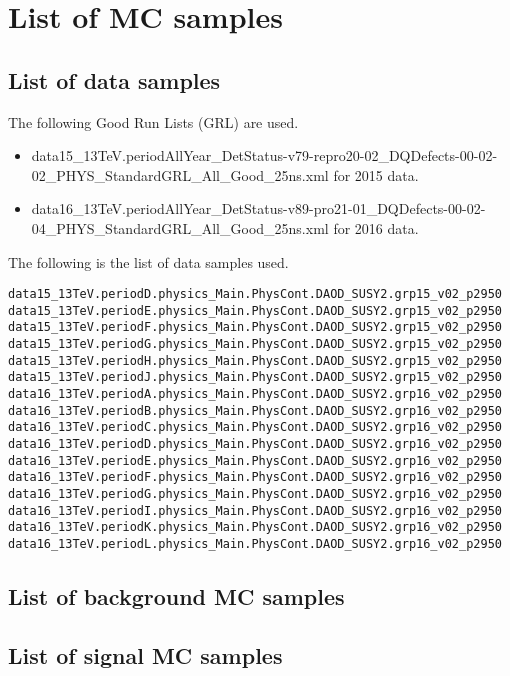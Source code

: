 \chapter{List of MC samples}
\label{ch:appendixOne}

\section{List of data samples}
\label{sec:List_Data}
The following Good Run Lists (GRL) are used.
\begin{itemize}
\item {\ttfamily\scriptsize data15\_13TeV.periodAllYear\_DetStatus-v79-repro20-02\_DQDefects-00-02-02\_PHYS\_StandardGRL\_All\_Good\_25ns.xml} for 2015 data.
\item {\ttfamily\scriptsize data16\_13TeV.periodAllYear\_DetStatus-v89-pro21-01\_DQDefects-00-02-04\_PHYS\_StandardGRL\_All\_Good\_25ns.xml} for 2016 data.
\end{itemize}
The following is the list of data samples used.
\scriptsize
\begin{verbatim}
data15_13TeV.periodD.physics_Main.PhysCont.DAOD_SUSY2.grp15_v02_p2950
data15_13TeV.periodE.physics_Main.PhysCont.DAOD_SUSY2.grp15_v02_p2950
data15_13TeV.periodF.physics_Main.PhysCont.DAOD_SUSY2.grp15_v02_p2950
data15_13TeV.periodG.physics_Main.PhysCont.DAOD_SUSY2.grp15_v02_p2950
data15_13TeV.periodH.physics_Main.PhysCont.DAOD_SUSY2.grp15_v02_p2950
data15_13TeV.periodJ.physics_Main.PhysCont.DAOD_SUSY2.grp15_v02_p2950
data16_13TeV.periodA.physics_Main.PhysCont.DAOD_SUSY2.grp16_v02_p2950
data16_13TeV.periodB.physics_Main.PhysCont.DAOD_SUSY2.grp16_v02_p2950
data16_13TeV.periodC.physics_Main.PhysCont.DAOD_SUSY2.grp16_v02_p2950
data16_13TeV.periodD.physics_Main.PhysCont.DAOD_SUSY2.grp16_v02_p2950
data16_13TeV.periodE.physics_Main.PhysCont.DAOD_SUSY2.grp16_v02_p2950
data16_13TeV.periodF.physics_Main.PhysCont.DAOD_SUSY2.grp16_v02_p2950
data16_13TeV.periodG.physics_Main.PhysCont.DAOD_SUSY2.grp16_v02_p2950
data16_13TeV.periodI.physics_Main.PhysCont.DAOD_SUSY2.grp16_v02_p2950
data16_13TeV.periodK.physics_Main.PhysCont.DAOD_SUSY2.grp16_v02_p2950
data16_13TeV.periodL.physics_Main.PhysCont.DAOD_SUSY2.grp16_v02_p2950
\end{verbatim}
\normalsize

\section{List of background MC samples}
\label{sec:MCBG}












\clearpage
\section{List of signal MC samples}
\label{sec:MCSig}

